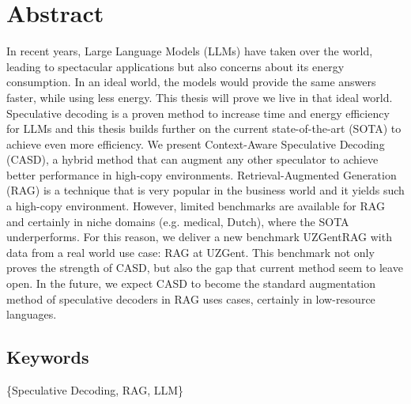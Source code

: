 
\titleformat{\chapter}{}{}{0em}{\bf\Huge}
\chapter*{Abstract}


In recent years, Large Language Models (LLMs) have taken over the world, leading to spectacular applications but also concerns about its energy consumption. In an ideal world, the models would provide the same answers faster, while using less energy. This thesis will prove we live in that ideal world. Speculative decoding is a proven method to increase time and energy efficiency for LLMs and this thesis builds further on the current state-of-the-art (SOTA) to achieve even more efficiency. We present Context-Aware Speculative Decoding (CASD), a hybrid method that can augment any other speculator to achieve better performance in high-copy environments. Retrieval-Augmented Generation (RAG) is a technique that is very popular in the business world and it yields such a high-copy environment. However, limited benchmarks are available for RAG and certainly in niche domains (e.g. medical, Dutch), where the SOTA underperforms. For this reason, we deliver a new benchmark UZGentRAG with data from a real world use case: RAG at UZGent. This benchmark not only proves the strength of CASD, but also the gap that current method seem to leave open. In the future, we expect CASD to become the standard augmentation method of speculative decoders in RAG uses cases, certainly in low-resource languages.

\section*{Keywords}
\{Speculative Decoding, RAG, LLM\}
